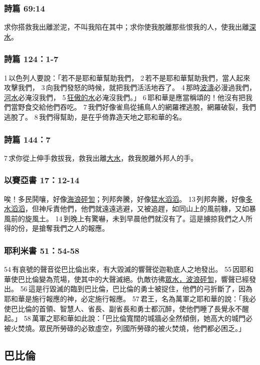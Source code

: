 \subsubsection{詩篇 69:14}
求你搭救我出離淤泥，不叫我陷在其中；求你使我脫離那些恨我的人，使我出離\underline{深水}。

\subsubsection{詩篇 124：1-7}
1 以色列人要說：「若不是耶和華幫助我們，
2 若不是耶和華幫助我們，當人起來攻擊我們，
3 向我們發怒的時候，就把我們活活地吞了。
4 那時\underline{波濤}必漫過我們，\underline{河水}必淹沒我們，
5 \underline{狂傲的水}必淹沒我們。」
6 耶和華是應當稱頌的！他沒有把我們當野食交給他們吞吃。
7 我們好像雀鳥從捕鳥人的網羅裡逃脫，網羅破裂，我們逃脫了。
8 我們得幫助，是在乎倚靠造天地之耶和華的名。

\subsubsection{詩篇 144：7}
7 求你從上伸手救拔我，救我出離\underline{大水}，救我脫離外邦人的手。

\subsubsection{以賽亞書 17：12-14}
唉！多民鬨嚷，好像\underline{海浪砰訇}；列邦奔騰，好像\underline{猛水滔滔}。 13 列邦奔騰，好像\underline{多水滔滔}，但神斥責他們，他們就遠遠逃避，又被追趕，如同山上的風前糠，又如暴風前的旋風土。 14 到晚上有驚嚇，未到早晨他們就沒有了。這是擄掠我們之人所得的份，是搶奪我們之人的報應。

\subsubsection{耶利米書 51：54-58}
54 有哀號的聲音從巴比倫出來，有大毀滅的響聲從迦勒底人之地發出。 55 因耶和華使巴比倫變為荒場，使其中的大聲滅絕。仇敵彷彿\underline{眾水，波浪砰訇}，響聲已經發出。 56 這是行毀滅的臨到巴比倫，巴比倫的勇士被捉住，他們的弓折斷了，因為耶和華是施行報應的神，必定施行報應。 57 君王，名為萬軍之耶和華的說：「我必使巴比倫的首領、智慧人、省長、副省長和勇士都沉醉，使他們睡了長覺永不醒起。」 58 萬軍之耶和華如此說：「巴比倫寬闊的城牆必全然傾倒，她高大的城門必被火焚燒。眾民所勞碌的必致虛空，列國所勞碌的被火焚燒，他們都必困乏。」


\subsection{巴比倫}

